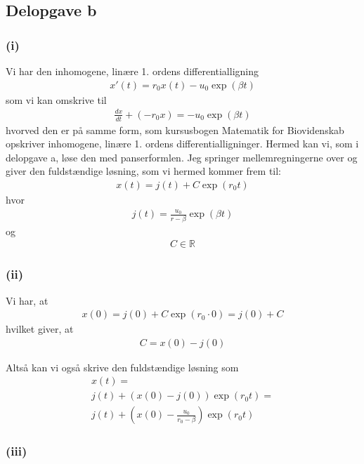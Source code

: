 \documentclass[12pt]{article}
\begin{document}
\subsection{Delopgave b}

\subsubsection{(i)}

Vi har den inhomogene, linære 1. ordens differentialligning
\begin{align}
x'(t) = r_0x(t) - u_0\exp(\beta t)
\end{align}
som vi kan omskrive til  
\begin{align}
\frac{dx}{dt} + (-r_0 x) = - u_0\exp(\beta t)
\end{align}
hvorved den er på samme form, som kursusbogen Matematik for Biovidenskab opskriver inhomogene, linære 1. ordens differentialligninger. Hermed kan vi, som i delopgave a, løse den med panserformlen. Jeg springer mellemregningerne over og giver den fuldstændige løsning, som vi hermed kommer frem til:
\begin{align}
x(t) = j(t) + C \exp(r_0 t )
\end{align}
hvor 
\begin{align}
j(t) = \frac{u_0 }{r - \beta} \exp(\beta t)
\end{align}
og 
\begin{align}
C \in \mathbb{R}
\end{align}

\subsubsection{(ii)}

Vi har, at
\begin{align}
x(0) = j(0) + C\exp(r_0\cdot 0) = j(0) + C
\end{align}
hvilket giver, at
\begin{align}
C = x(0) - j(0)
\end{align}

Altså kan vi også skrive den fuldstændige løsning som
\begin{align}
x(t) = \\ j(t) + (x(0) - j(0))\exp(r_0t) = \\ j(t) + \left(x(0) - \frac{u_0 }{r_0 - \beta} \right)\exp(r_0t)
\end{align}

\subsubsection{(iii)}
\end{document}
